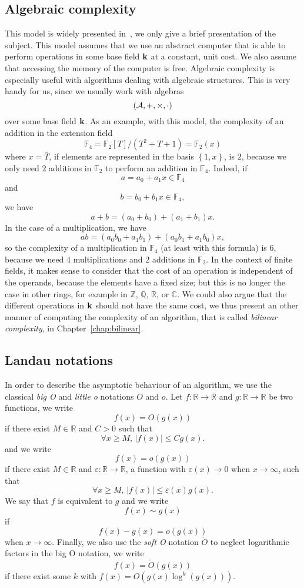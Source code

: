 \subsection{Algebraic complexity}
\label{sec:algebraic-complexity}

This model is widely presented in~\cite{BCS13}, we only give a brief
presentation of the subject. This model assumes that we use an abstract computer
that is able to perform operations in some base field $\mathbf{k}$ at a constant, unit
cost. We also assume that accessing the memory of the computer is free.
Algebraic complexity is especially useful with algorithms dealing with
algebraic structures. This is very handy for us, since
we usually work with algebras
\[
  (\mathcal{A}, +, \times, \cdot)
\]
over some base field $\mathbf{k}$. As an example, with this model, the complexity of an
addition in the extension field
\[
  \mathbb{F}_4 = \mathbb{F}_2[T]/(T^2+T+1) = \mathbb{F}_2(x)
\]
where $x=\bar T$, if elements are represented in the basis $\left\{ 1, x
\right\}$, is $2$, because we only need $2$ additions in $\mathbb{F}_2$ to
perform an addition in $\mathbb{F}_4$. Indeed, if
\[
  a = a_0 + a_1x\in\mathbb{F}_4
\]
and
\[
  b = b_0 + b_1x\in\mathbb{F}_4,
\]
we have
\[
  a+b = (a_0+b_0)+(a_1+b_1)x.
\]
In the case of a multiplication, we have
\[
  ab = (a_0b_0+a_1b_1) + (a_0b_1+a_1b_0)x,
\]
so the complexity of a multiplication in $\mathbb{F}_4$ (at least with this
formula) is $6$, because we need
$4$ multiplications and $2$ additions in $\mathbb{F}_2$. In the context of
finite fields, it makes sense to consider that the cost of an operation is
independent of the operands, because the elements have a fixed size; but this is
no longer the case in other rings, for example in $\mathbb{Z}$, $\mathbb{Q}$,
$\mathbb{R}$, or $\mathbb{C}$. We could also argue that the different operations
in $\mathbf{k}$ should not have the same cost, we thus present an other manner of
computing the complexity of an algorithm, that is called \emph{bilinear
complexity}, in Chapter~\ref{chap:bilinear}.

\subsection{Landau notations}

In order to describe the asymptotic behaviour of an algorithm, we use the
classical \emph{big O} and \emph{little o} notations $O$ and $o$. Let $f:\mathbb{R}\to\mathbb{R}$ and
$g:\mathbb{R}\to\mathbb{R}$ be two functions, we write
\[
  f(x) = O(g(x))
\]
if there exist $M\in\mathbb{R}$ and $C>0$ such that
\[
  \forall x\geq M,\,|f(x)|\leq Cg(x).
\]
and we write
\[
  f(x)=o(g(x))
\]
if there exist $M\in\mathbb{R}$ and $\varepsilon:\mathbb{R}\to\mathbb{R}$, a
function with $\varepsilon(x)\to 0$ when $x\to\infty$, such
that
\[
  \forall x\geq M,\,|f(x)|\leq \varepsilon(x)g(x).
\]
We say that $f$ is equivalent to $g$ and we write
\[
  f(x)\sim g(x)
\]
if 
\[
 f(x)-g(x) = o(g(x))
\]
when $x\to\infty$. Finally, we also use the \emph{soft O} notation $\tilde{O}$ to neglect
logarithmic factors in the big O notation, we write
\[
  f(x) = \tilde{O}(g(x))
\]
if there exist some $k$ with $f(x) = O(g(x)\log^k(g(x)))$.

